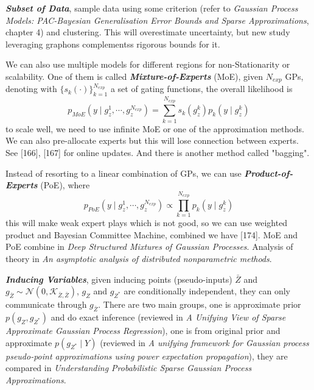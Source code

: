 \documentclass[10pt]{elegantbook}
\newcommand{\mydefination}[1]{\textbf{\textit{\textcolor{structurecolor}{#1}}}}
\begin{document}
\mydefination{Subset of Data}, sample data using some criterion (refer to \textit{Gaussian Process Models: PAC-Bayesian 
Generalisation Error Bounds and Sparse Approximations}, chapter 4) and clustering. This will overestimate uncertainty, but 
new study leveraging graphons complementss rigorous bounds for it. 

We can also use multiple models for different regions for non-Stationarity or scalability. One of them is called \mydefination{Mixture-of-Experts}
(MoE), given $N_{exp}$ GPs, denoting with $\{ s_k(\cdot) \}_{k=1}^{N_{exp}}$ a set of gating functions, the overall likelihood is
\[
p_{MoE}(y \mid g_z^1, \cdots, g_z^{N_{exp}}) = \sum_{k=1}^{N_{exp}} s_k(g_z^k)p_k(y \mid g_z^k)
\]
to scale well, we need to use infinite MoE or one of the approximation methods. We can also pre-allocate experts but this will
lose connection between experts. See [166], [167] for online updates. And there is another method called "bagging".

Instead of resorting to a linear combination of GPs, we can use \mydefination{Product-of-Experts} (PoE), where
\[
p_{PoE}(y \mid g_z^1, \cdots, g_z^{N_{exp}}) \propto \prod_{k=1}^{N_{exp}} p_k(y \mid g_z^k)
\]
this will make weak expert plays which is not good, so we can use weighted product and Bayesian Committee Machine, combined
we have [174]. MoE and PoE combine in \textit{Deep Structured Mixtures of Gaussian Processes}. Analysis of theory 
in \textit{An asymptotic analysis of distributed nonparametric methods}.

\mydefination{Inducing Variables}, given inducing points (pseudo-inputs) $\bar Z$ and $g_{\bar Z} \sim \mathcal N(0, \mathscr{K}_{\bar Z, \bar Z})$, 
$g_Z$ and $g_{Z^*}$ are conditionally independent, they can only communicate through $g_{\bar Z}$. There are two main groups,
one is approximate prior $p(g_Z, g_{Z^*})$ and do exact inference (reviewed in \textit{A Unifying View of Sparse Approximate Gaussian Process Regression}),
one is from original prior and approximate $p(g_{Z^*} \mid Y)$ (reviewed in \textit{A unifying framework for Gaussian process pseudo-point approximations using power expectation propagation}),
they are compared in \textit{Understanding Probabilistic Sparse Gaussian Process Approximations}.
\end{document}
